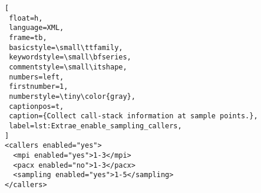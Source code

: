 \begin{lstlisting}[
 float=h,
 language=XML,
 frame=tb,
 basicstyle=\small\ttfamily,
 keywordstyle=\small\bfseries,
 commentstyle=\small\itshape,
 numbers=left,
 firstnumber=1,
 numberstyle=\tiny\color{gray},
 captionpos=t,
 caption={Collect call-stack information at sample points.},
 label=lst:Extrae_enable_sampling_callers,
]
<callers enabled="yes">
  <mpi enabled="yes">1-3</mpi>
  <pacx enabled="no">1-3</pacx>
  <sampling enabled="yes">1-5</sampling>
</callers>
\end{lstlisting}
